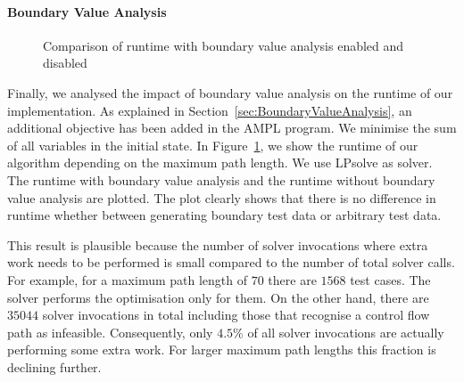 \documentclass[runningheads,a4paper]{llncs}%
\begin{document}
\paragraph{Boundary Value Analysis}
\label{sec:caseStudyBoundaryValues}
\begin{figure}
\begin{center}
%
\end{center}%
\caption{Comparison of runtime with boundary value analysis enabled and disabled}%
\label{fig:RuntimeBoundaryValue}%
\end{figure}%
Finally, we analysed the impact of boundary value analysis on the runtime of our
implementation. As explained in Section~\ref{sec:BoundaryValueAnalysis}, an
additional objective has been added in the AMPL program. We minimise the sum of
all variables in the initial state. In Figure~\ref{fig:RuntimeBoundaryValue}, we
show the runtime of our algorithm depending on the maximum path length. We use
LPsolve as solver. The runtime with boundary value analysis and the runtime
without boundary value analysis are plotted. The plot clearly shows that there
is no difference in runtime whether between generating boundary test data or
arbitrary test data.

This result is plausible because the number of solver invocations where extra work needs to be performed is small compared to the number of total solver calls. For example, for a maximum path length of $70$ there are $1568$
test cases. The solver performs the optimisation only for them. On the other
hand, there are $35044$ solver invocations in total including those that
recognise a control flow path as infeasible. Consequently, only $4.5\%$ of all
solver invocations are actually performing some extra work. For larger maximum
path lengths this fraction is declining further.
\end{document}
